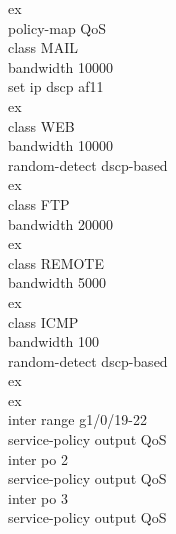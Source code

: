 \documentclass[a4paper, 12pt]{article}
\begin{document}
{\hspace*{2cm}ex\\
\hspace*{2cm}policy-map QoS\\
\hspace*{2cm}class MAIL\\
\hspace*{2cm}bandwidth 10000\\
\hspace*{2cm}set ip dscp af11\\
\hspace*{2cm}ex\\
\hspace*{2cm}class WEB\\
\hspace*{2cm}bandwidth 10000\\
\hspace*{2cm}random-detect dscp-based\\
\hspace*{2cm}ex\\
\hspace*{2cm}class FTP\\
\hspace*{2cm}bandwidth 20000\\
\hspace*{2cm}ex\\
\hspace*{2cm}class REMOTE\\
\hspace*{2cm}bandwidth 5000\\
\hspace*{2cm}ex\\
\hspace*{2cm}class ICMP\\
\hspace*{2cm}bandwidth 100\\
\hspace*{2cm}random-detect dscp-based\\
\hspace*{2cm}ex\\
\hspace*{2cm}ex\\
\hspace*{2cm}inter range g1/0/19-22\\
\hspace*{2cm}service-policy output QoS\\
\hspace*{2cm}inter po 2\\
\hspace*{2cm}service-policy output QoS\\
\hspace*{2cm}inter po 3\\
\hspace*{2cm}service-policy output QoS\\}
\end{document}
